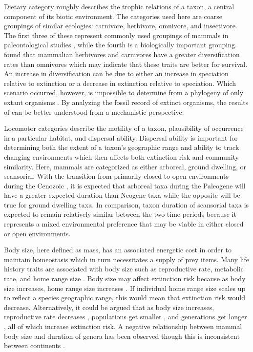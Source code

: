 \documentclass[12pt,letterpaper]{article}
\begin{document}
Dietary category roughly describes the trophic relations of a taxon, a central component of its biotic environment. The categories used here are coarse groupings of similar ecologies: carnivore, herbivore, omnivore, and insectivore. The first three of these represent commonly used groupings of mammals in paleontological studies \citep{Jernvall2004,Price2012}, while the fourth is a biologically important grouping. \citet{Price2012} found that mammalian herbivores and carnivores have a greater diversification rates than omnivores which may indicate that these traits are better for survival. An increase in diversification can be due to either an increase in speciation relative to extinction or a decrease in extinction relative to speciation. Which scenario occurred, however, is impossible to determine from a phylogeny of only extant organisms \citep{Rabosky2010a}. By analyzing the fossil record of extinct organisms, the results of \citet{Price2012} can be better understood from a mechanistic perspective.

Locomotor categories describe the motility of a taxon, plausibility of occurrence in a particular habitat, and dispersal ability. Dispersal ability is important for determining both the extent of a taxon's geographic range and ability to track changing environments \citep{Birand2012,Jablonski2006a,Gaston2009} which then affects both extinction risk and community similarity. Here, mammals are categorized as either arboreal, ground dwelling, or scansorial. With the transition from primarily closed to open environments during the Cenozoic \citep{Blois2009,Janis1993a,Stromberg2005,Stromberg2013}, it is expected that arboreal taxa during the Paleogene will have a greater expected duration than Neogene taxa while the opposite will be true for ground dwelling taxa. In comparison, taxon duration of scansorial taxa is expected to remain relatively similar between the two time periods because it represents a mixed environmental preference that may be viable in either closed or open environments. 

Body size, here defined as mass, has an associated energetic cost in order to maintain homeostasis which in turn necessitates a supply of prey items. Many life history traits are associated with body size such as reproductive rate, metabolic rate, and home range size \cite{Peters1983a,Damuth1979,Brown1987,Smith2004}. Body size may affect extinction risk because as body size increases, home range size increases \citep{Damuth1979}. If individual home range size scales up to reflect a species geographic range, this would mean that extinction risk would decrease. Alternatively, it could be argued that as body size increases, reproductive rate decreases \citep{Johnson2002b}, populations get smaller \citep{White2007}, and generations get longer \citep{Martin1993a}, all of which increase extinction risk. A negative relationship between mammal body size and duration of genera has been observed \citep{Liow2008,Davidson2012} though this is inconsistent between continents \citep{Tomiya2013,Liow2008}. 

\end{document}
